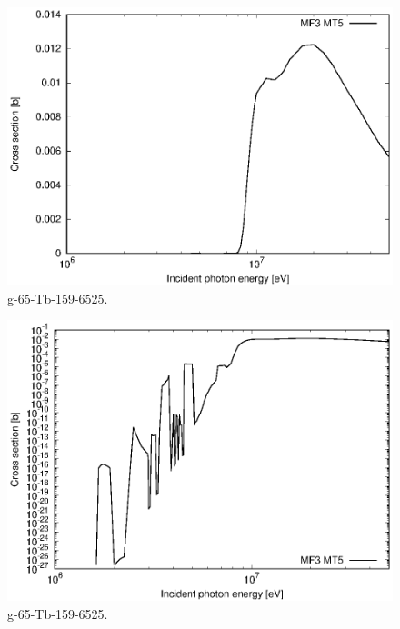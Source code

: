 \begin{figure}
 \includegraphics[width=\linewidth]{eps/g_65-Tb-159_6525.eps}
  \caption{g-65-Tb-159-6525.}
\end{figure}
\begin{figure}
 \includegraphics[width=\linewidth]{eps-log/g_65-Tb-159_6525.eps}
 \caption{g-65-Tb-159-6525.}
\end{figure}
\newpage \clearpage

